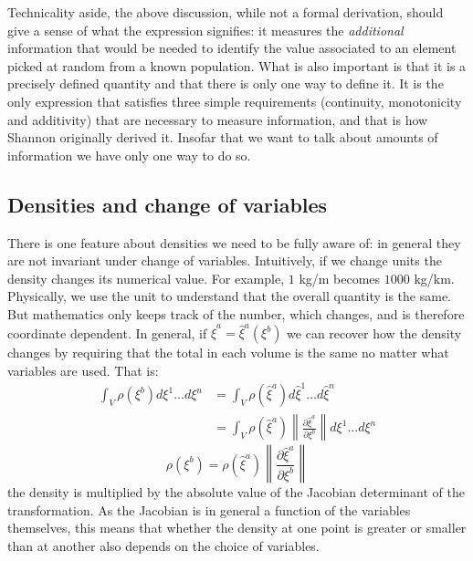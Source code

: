 \documentclass[11pt]{article}
\begin{document}
Technicality aside, the above discussion, while not a formal derivation, should give a sense of what the expression signifies: it measures the \emph{additional} information that would be needed to identify the value associated to an element picked at random from a known population. What is also important is that it is a precisely defined quantity and that there is only one way to define it. It is the only expression that satisfies three simple requirements (continuity, monotonicity and additivity) that are necessary to measure information, and that is how Shannon originally derived it. Insofar that we want to talk about amounts of information we have only one way to do so.

\subsection*{Densities and change of variables}

There is one feature about densities we need to be fully aware of: in general they are not invariant under change of variables. Intuitively, if we change units the density changes its numerical value. For example, $1$ kg/m becomes $1000$ kg/km. Physically, we use the unit to understand that the overall quantity is the same. But mathematics only keeps track of the number, which changes, and is therefore coordinate dependent. In general, if $\hat{\xi}^a=\hat{\xi}^a(\xi^b)$ we can recover how the density changes by requiring that the total in each volume is the same no matter what variables are used. That is:
\begin{align*}
\int_V \rho(\xi^b) d\xi^1 ... d\xi^n &= \int_V \rho(\hat{\xi}^a) d\hat{\xi}^1 ... d\hat{\xi}^n \\
&=\int_V\rho(\hat{\xi}^a) \left\|\frac{\partial \hat{\xi}^a}{\partial \xi^b}\right\| d\xi^1 ... d\xi^n
\end{align*}
\begin{equation}\label{density_transformation}
\rho(\xi^b) = \rho(\hat{\xi}^a) \left\|\frac{\partial \hat{\xi}^a}{\partial \xi^b}\right\|
\end{equation}
the density is multiplied by the absolute value of the Jacobian determinant of the transformation. As the Jacobian is in general a function of the variables themselves, this means that whether the density at one point is greater or smaller than at another also depends on the choice of variables.
\end{document}
